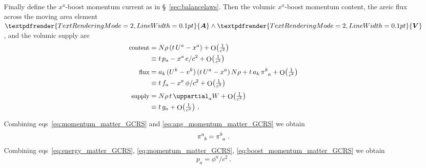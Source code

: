 \documentclass[\ifafour a4paper,12pt,\else a5paper,10pt,\fi%
onecolumn,oneside,article,%
british%
]{memoir}
\makeatletter
\theoremstyle{remark}
\theoremstyle{innote}
\def\sum{\DOTSI\sumop\slimits@}
\newcommand*{\mathte}[1]{\textbf{\textit{\textsf{#1}}}}
\renewcommand*{\bm}[1]{\textpdfrender{TextRenderingMode=2,LineWidth=0.1pt}{\boldsymbol{#1}}}
\newcommand*{\de}{\uppartial}%
\DeclareMathOperator{\Ord}{O}%
\newcommand*{\p}{\mathrm{p}}%
\renewcommand*{\|}[1][]{\nonscript\:#1\vert\nonscript\:\mathopen{}}
\newcommand*{\sect}{\S}%
\newcommand*{\eqns}{eqs}%
\newcommand*{\tsum}{\mathop{\textstyle\sum}\nolimits}
\renewcommand*{\i}{{}\indices}
\newcommand*{\yu}{\bm{u}}
\newcommand*{\yo}{\bm{\omega}}
\newcommand*{\yW}{W}
\newcommand*{\yF}{\mathte{F}}
\newcommand*{\yE}{\bm{E}}
\newcommand*{\Oc}[1]{\Ord\bigl(\tfrac{1}{c^{#1}}\bigr)}
\makeatother
\begin{document}
Finally define the $x^{a}$-boost momentum current as in \sect~\ref{sec:balancelaws}. Then the volumic $x^{a}$-boost momentum content, the areic flux across the moving area element $\bm{A}\land\bm{V}$, and the volumic supply are
\begin{equation}
  \label{eq:boost_momentum_matter_GCRS}
  \begin{aligned}
    \text{\small content}&= N\rho\, (t\,U^{a} - x^{a}) + \Oc{2}
    \\
    &\equiv t\,p_{a} - x^{a}\,e/c^{2} + \Oc{2}
    \\[\jot]
    \text{\small flux}&=
    \!\begin{multlined}[t][0.8\linewidth]
      a_{k}\,(U^{k}-v^{k}) \, (t\,U^{a} - x^{a}) \,N\rho +
      t\,a_{k}\,\pi\i{^{k}_{a}}  + \Oc{2}
    \end{multlined}
    \\
    &\equiv t\,f_{a} - x^{a}\,\phi/c^{2} + \Oc{2}
    \\[\jot]
    \text{\small supply}&= N\rho\,t\,\de_{a}\yW+ \Oc{2} 
    \\
    &\equiv t\,g_{a} + \Oc{2} \ .
  \end{aligned}
\end{equation}

Combining \eqns~\eqref{eq:momentum_matter_GCRS} and \eqref{eq:ang_momentum_matter_GCRS} we obtain
\begin{equation}
  \label{eq:stress_sym_GCRS}
  \pi\i{^{a}_{b}} = \pi\i{^{b}_{a}} \ .
\end{equation}
Combining \eqns~\eqref{eq:energy_matter_GCRS}, \eqref{eq:momentum_matter_GCRS}, \eqref{eq:boost_momentum_matter_GCRS} we obtain
\begin{equation}
  \label{eq:equiv_mom_enflux_GCRS}
  p_{a} = \phi^{a}/c^{2} \ .
\end{equation}


\end{document}
